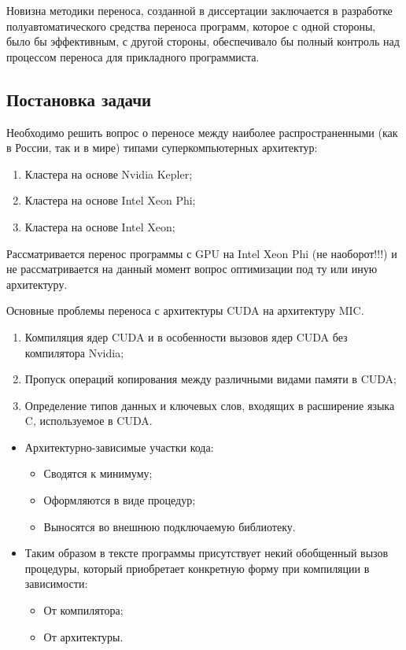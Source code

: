 Новизна методики переноса, созданной в диссертации заключается в разработке полуавтоматического средства переноса программ,
которое с одной стороны, было бы эффективным,
с другой стороны, обеспечивало бы полный контроль над процессом переноса для прикладного программиста.

\subsection{Постановка задачи}

Необходимо решить вопрос о переносе между наиболее распространенными (как в России, так и в мире) типами суперкомпьютерных архитектур:
\begin{enumerate}
	\item Кластера на основе Nvidia Kepler; 
	\item Кластера на основе Intel Xeon Phi;
	\item Кластера на основе Intel Xeon;
\end{enumerate}
Рассматривается перенос программы с GPU на Intel Xeon Phi (не наоборот!!!) и не рассматривается на данный момент вопрос оптимизации под ту или иную архитектуру.

Основные проблемы переноса с архитектуры CUDA\cite{CUDAweb,Boreskov,Sanders} на архитектуру MIC\cite{MorganPhi,FangPhi2014}.
\begin{enumerate}
	\item Компиляция ядер CUDA 
	и в особенности вызовов ядер CUDA без компилятора Nvidia;
	\item Пропуск операций копирования между различными видами памяти в CUDA;
	\item Определение типов данных и ключевых слов, входящих в расширение языка C, используемое в CUDA.
\end{enumerate}


\begin{itemize}
	\item Архитектурно-зависимые участки кода: 
	\begin{itemize}
		\item Сводятся к минимуму;
		\item Оформляются в виде процедур; 
		\item Выносятся во внешнюю подключаемую библиотеку.
	\end{itemize}
	\item Таким образом в тексте программы присутствует некий обобщенный вызов процедуры, который приобретает конкретную форму при компиляции в зависимости:
	\begin{itemize}
		\item От компилятора;
		\item От архитектуры.
	\end{itemize}
\end{itemize}

